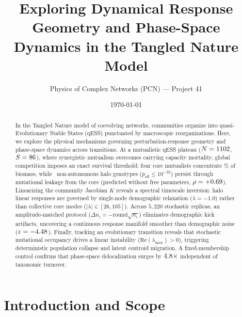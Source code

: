 \documentclass[twocolumn,amsmath,amssymb,aps,pra,10pt,floatfix,nofootinbib]{revtex4-2}
\begin{document}
\renewcommand{\thefootnote}{\fnsymbol{footnote}}

\title{Exploring Dynamical Response Geometry and Phase-Space Dynamics in the Tangled Nature Model}

\author{Physics of Complex Networks (PCN) --- Project 41}
\date{\today}

\begin{abstract}
In the Tangled Nature model of coevolving networks, communities organize into quasi-Evolutionary Stable States (qESS) punctuated by macroscopic reorganizations. Here, we explore the physical mechanisms governing perturbation-response geometry and phase-space dynamics across transitions. At a mutualistic qESS plateau ($N=1102$, $S=86$), where synergistic mutualism overcomes carrying capacity mortality, global competition imposes an exact survival threshold: four core mutualists concentrate \corebio\% of biomass, while \nhalo\ non-autonomous halo genotypes ($p_{\text{off}} \le 10^{-32}$) persist through mutational leakage from the core (predicted without free parameters, $\rho = +0.69$). Linearizing the community Jacobian $K$ reveals a spectral timescale inversion: halo linear responses are governed by single-node demographic relaxation ($\lambda = -1.0$) rather than collective core modes ($|\lambda| \in [26, 105]$). Across $5{,}220$ stochastic replicas, an amplitude-matched protocol ($\Delta n_i = -\mathrm{round}\sqrt{n_i}$) eliminates demographic kick artifacts, uncovering a continuous response manifold smoother than demographic noise ($z = -4.48$). Finally, tracking an evolutionary transition reveals that stochastic mutational occupancy drives a linear instability ($\mathrm{Re}(\lambda_{\max}) > 0$), triggering deterministic population collapse and latent centroid migration. A fixed-membership control confirms that phase-space delocalization surges by $4.8\times$ independent of taxonomic turnover.
\end{abstract}

\maketitle

\section{Introduction and Scope}
\label{sec:intro}
\end{document}
